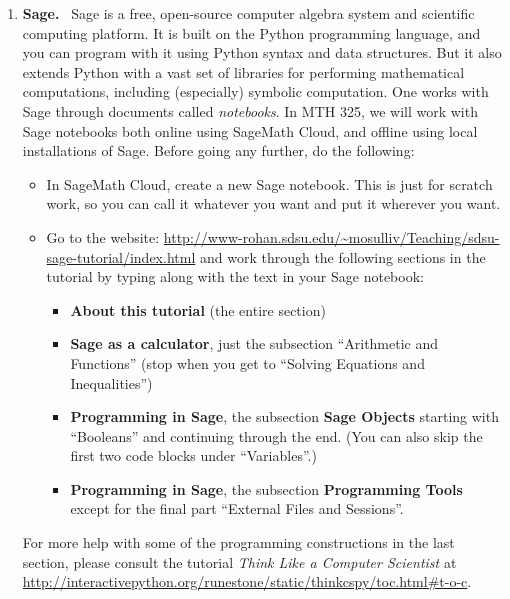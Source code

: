 \documentclass[11pt,letterpaper]{article}
\begin{document}
\begin{enumerate}
\item \textbf{Sage.} \ Sage is a free, open-source computer algebra system and scientific computing platform. It is built on the Python programming language, and you can program with it using Python syntax and data structures. But it also extends Python with a vast set of libraries for performing mathematical computations, including (especially) symbolic computation. One works with Sage through documents called \emph{notebooks}. In MTH 325, we will work with Sage notebooks both online using SageMath Cloud, and offline using local installations of Sage. Before going any further, do the following: 
	\begin{itemize}
		\item In SageMath Cloud, create a new Sage notebook. This is just for scratch work, so you can call it whatever you want and put it wherever you want. 
		\item Go to the website: \url{http://www-rohan.sdsu.edu/~mosulliv/Teaching/sdsu-sage-tutorial/index.html} and work through the following sections in the tutorial by typing along with the text in your Sage notebook: 
		\begin{itemize}
			\item \textbf{About this tutorial} (the entire section)
			\item \textbf{Sage as a calculator}, just the subsection ``Arithmetic and Functions'' (stop when you get to ``Solving Equations and Inequalities'')
			\item \textbf{Programming in Sage}, the subsection \textbf{Sage Objects} starting with ``Booleans'' and continuing through the end. (You can also skip the first two code blocks under ``Variables''.) 
			\item \textbf{Programming in Sage}, the subsection \textbf{Programming Tools} except for the final part ``External Files and Sessions''. 
		\end{itemize}
	\end{itemize}
For more help with some of the programming constructions in the last section, please consult the tutorial \emph{Think Like a Computer Scientist} at \url{http://interactivepython.org/runestone/static/thinkcspy/toc.html#t-o-c}. 


\end{enumerate}
\end{document}
